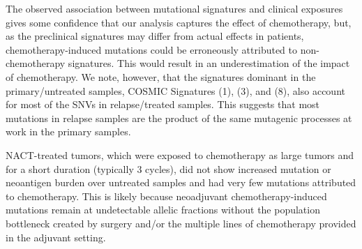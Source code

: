 The observed association between mutational signatures and clinical exposures gives some confidence that our analysis captures the effect of chemotherapy, but, as the preclinical signatures may differ from actual effects in patients, chemotherapy-induced mutations could be erroneously attributed to non-chemotherapy signatures. This would result in an underestimation of the impact of chemotherapy. We note, however, that the signatures dominant in the primary/untreated samples, COSMIC Signatures (1), (3), and (8), also account for most of the SNVs in relapse/treated samples. This suggests that most mutations in relapse samples are the product of the same mutagenic processes at work in the primary samples.




NACT-treated tumors, which were exposed to chemotherapy as large tumors and for a short duration (typically 3 cycles), did not show increased mutation or neoantigen burden over untreated samples and had very few mutations attributed to chemotherapy. This is likely because neoadjuvant chemotherapy-induced mutations remain at undetectable allelic fractions without the population bottleneck created by surgery and/or the multiple lines of chemotherapy provided in the adjuvant setting.


